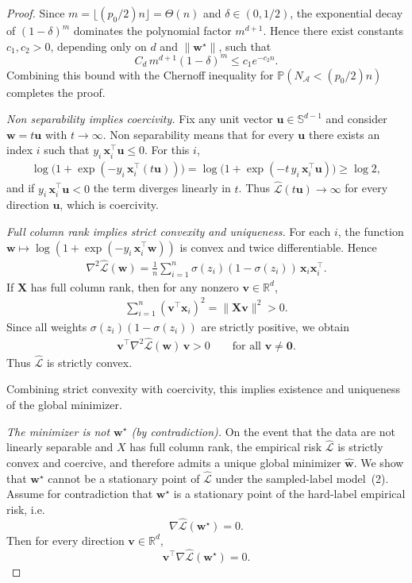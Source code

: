 \documentclass{article}
\theoremstyle{plain}
\theoremstyle{definition}
\theoremstyle{remark}
\begin{document}
{\begin{proof}
Since $m=\lfloor(p_0/2)n\rfloor=\Theta(n)$ and $\delta\in(0,1/2)$,
the exponential decay of $(1-\delta)^m$ dominates the polynomial factor
$m^{d+1}$. Hence there exist constants $c_1,c_2>0$, depending only on
$d$ and $\|\mathbf w^\star\|$, such that
\[
C_d\,m^{d+1}(1-\delta)^m \le c_1 e^{-c_2 n}.
\]
Combining this bound with the Chernoff inequality for
$\mathbb P(N_{\mathcal A}<(p_0/2)n)$ completes the proof.


\textit{Non separability implies coercivity.}
Fix any unit vector $\mathbf{u}\in\mathbb{S}^{d-1}$ and consider $\mathbf{w}=t\mathbf{u}$ with $t\to\infty$. Non separability means that for every $\mathbf{u}$ there exists an index $i$ such that $y_i\,\mathbf{x}_i^\top \mathbf{u}\le 0$. For this $i$,
\begin{align}
\log\!\bigl(1+\exp(-y_i\,\mathbf{x}_i^\top (t\mathbf{u}))\bigr)
= \log\!\bigl(1+\exp(-t\,y_i\,\mathbf{x}_i^\top \mathbf{u})\bigr)
\ge \log 2,
\end{align}
and if $y_i\,\mathbf{x}_i^\top \mathbf{u}<0$ the term diverges linearly in $t$. Thus $\widehat{\mathcal{L}}(t\mathbf{u})\to\infty$ for every direction $\mathbf{u}$, which is coercivity.

\textit{Full column rank implies strict convexity and uniqueness.}
For each $i$, the function $\mathbf{w}\mapsto \log(1+\exp(-y_i\,\mathbf{x}_i^\top \mathbf{w}))$ is convex and twice differentiable. Hence
\begin{align}
\nabla^2 \widehat{\mathcal{L}}(\mathbf{w})
= \frac{1}{n}\sum_{i=1}^n \sigma(z_i)(1-\sigma(z_i))\,\mathbf{x}_i\mathbf{x}_i^\top.
\end{align}
If $\mathbf{X}$ has full column rank, then for any nonzero $\mathbf{v}\in\mathbb{R}^d$,
\begin{align}
\sum_{i=1}^n (\mathbf{v}^\top \mathbf{x}_i)^2 = \|\mathbf{X}\mathbf{v}\|^2 > 0.
\end{align}
Since all weights $\sigma(z_i)(1-\sigma(z_i))$ are strictly positive, we obtain
\begin{align}
\mathbf{v}^\top \nabla^2\widehat{\mathcal{L}}(\mathbf{w})\,\mathbf{v} > 0
\qquad \text{for all }\mathbf{v}\neq \mathbf{0}.
\end{align}
Thus $\widehat{\mathcal{L}}$ is strictly convex.

Combining strict convexity with coercivity, this implies existence and uniqueness of the global minimizer.

\textit{The minimizer is not $\mathbf w^\star$ (by contradiction).}
On the event that the data are not linearly separable and $X$ has full column rank,
the empirical risk $\widehat{\mathcal L}$ is strictly convex and coercive, and therefore
admits a unique global minimizer $\widehat{\mathbf w}$.
We show that $\mathbf w^\star$ cannot be a stationary point of $\widehat{\mathcal L}$
under the sampled-label model~(2). Assume for contradiction that $\mathbf w^\star$ is a stationary point of the
hard-label empirical risk, i.e.
\[
\nabla \widehat{\mathcal L}(\mathbf w^\star)=0.
\]
Then for every direction $\mathbf v\in\mathbb R^d$,
\[
\mathbf v^\top \nabla \widehat{\mathcal L}(\mathbf w^\star)=0.
\]


\end{proof}}
\end{document}
